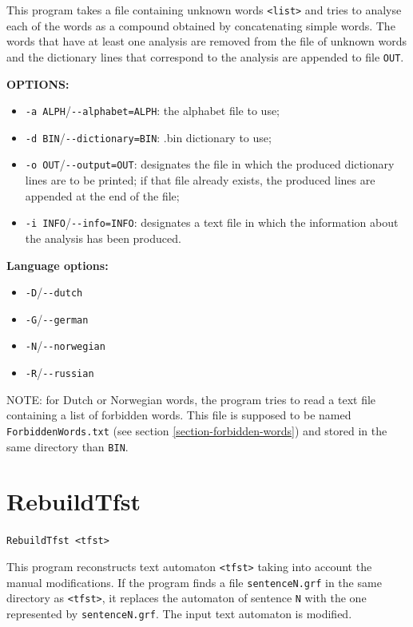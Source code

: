 \bigskip
\noindent This program takes a file containing unknown words \verb+<list>+ and
tries to analyse each of the words as a compound obtained by concatenating simple words. The words
that have at least one analysis are removed from the file of unknown words and
the dictionary lines that correspond to the analysis are appended to file
\verb+OUT+. 

\bigskip
\noindent \textbf{OPTIONS:}
\begin{itemize}
  \item \verb+-a ALPH+/\verb+--alphabet=ALPH+: the alphabet file to use;

  \item \verb+-d BIN+/\verb+--dictionary=BIN+: .bin dictionary to use;

  \item \verb+-o OUT+/\verb+--output=OUT+: designates the file in which the 
  produced dictionary lines are to be printed; if that file already exists, 
  the produced lines are appended at the end of the file;

  \item \verb+-i INFO+/\verb+--info=INFO+: designates a text file in which 
  the information about the analysis has been produced.
\end{itemize}

\bigskip
\noindent \textbf{Language options:}
\begin{itemize}
  \item \verb+-D+/\verb+--dutch+
  \item \verb+-G+/\verb+--german+
  \item \verb+-N+/\verb+--norwegian+
  \item \verb+-R+/\verb+--russian+
\end{itemize}  

\bigskip
\noindent NOTE: for Dutch or Norwegian words, the program tries to read a text
file containing a list of forbidden words. This file is supposed to be named
\verb+ForbiddenWords.txt+ (see section \ref{section-forbidden-words}) and stored
in the same directory than \verb+BIN+.






\section{RebuildTfst}
\verb+RebuildTfst <tfst>+

\bigskip
\noindent {}This 
program reconstructs text automaton \verb+<tfst>+ taking into account the
manual modifications. If the program finds a file \verb+sentenceN.grf+ in the
same directory as \verb+<tfst>+, it replaces the automaton of sentence
\verb+N+ with the one represented by \verb+sentenceN.grf+. The input text
automaton is modified.






